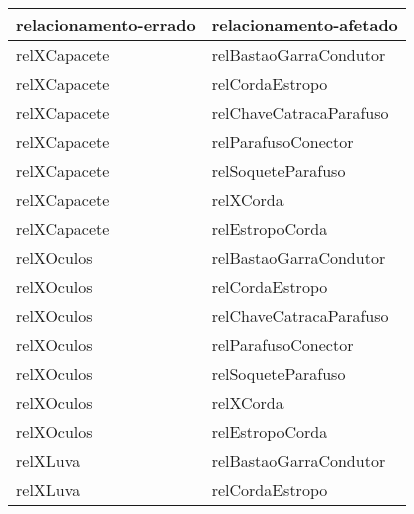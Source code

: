\begin{table}[H]
\centering
{}
\begin{tabular}{|l|l|}
\hline
\textbf{relacionamento-errado} & \textbf{relacionamento-afetado}   \\ \hline
relXCapacete                                    & relBastaoGarraCondutor                           \\ \hline
relXCapacete                                    & relCordaEstropo                                  \\ \hline
relXCapacete                                    & relChaveCatracaParafuso                          \\ \hline
relXCapacete                                    & relParafusoConector                              \\ \hline
relXCapacete                                    & relSoqueteParafuso                               \\ \hline
relXCapacete                                    & relXCorda                                        \\ \hline
relXCapacete                                    & relEstropoCorda                                  \\ \hline
relXOculos                                      & relBastaoGarraCondutor                           \\ \hline
relXOculos                                      & relCordaEstropo                                  \\ \hline
relXOculos                                      & relChaveCatracaParafuso                          \\ \hline
relXOculos                                      & relParafusoConector                              \\ \hline
relXOculos                                      & relSoqueteParafuso                               \\ \hline
relXOculos                                      & relXCorda                                        \\ \hline
relXOculos                                      & relEstropoCorda                                  \\ \hline
relXLuva                                        & relBastaoGarraCondutor                           \\ \hline
relXLuva                                        & relCordaEstropo                                  \\ \hline

\end{tabular}
\end{table}
